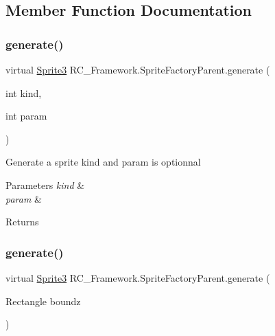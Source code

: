 \subsection{Member Function Documentation}
\mbox{\label{class_r_c___framework_1_1_sprite_factory_parent_a08e256b352d7f8042e9ee9d76206660d}} 
\subsubsection{\texorpdfstring{generate()}{generate()}\hspace{0.1cm}{\footnotesize\ttfamily [1/3]}}
{\footnotesize\ttfamily virtual \mbox{\hyperlink{class_r_c___framework_1_1_sprite3}{Sprite3}} R\+C\+\_\+\+Framework.\+Sprite\+Factory\+Parent.\+generate (\begin{DoxyParamCaption}\item[{int}]{kind,  }\item[{int}]{param }\end{DoxyParamCaption})\hspace{0.3cm}{\ttfamily [virtual]}}



Generate a sprite kind and param is optionnal 


\begin{DoxyParams}{Parameters}
{\em kind} & \\
\hline
{\em param} & \\
\hline
\end{DoxyParams}
\begin{DoxyReturn}{Returns}

\end{DoxyReturn}
\mbox{\label{class_r_c___framework_1_1_sprite_factory_parent_a81880f021af6b5ebe905b92a818cec07}} 
\subsubsection{\texorpdfstring{generate()}{generate()}\hspace{0.1cm}{\footnotesize\ttfamily [2/3]}}
{\footnotesize\ttfamily virtual \mbox{\hyperlink{class_r_c___framework_1_1_sprite3}{Sprite3}} R\+C\+\_\+\+Framework.\+Sprite\+Factory\+Parent.\+generate (\begin{DoxyParamCaption}\item[{Rectangle}]{boundz }\end{DoxyParamCaption})\hspace{0.3cm}{\ttfamily [virtual]}}



